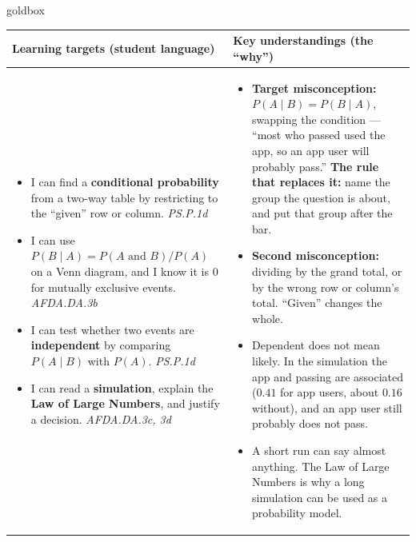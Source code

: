 \documentclass[10pt]{article}
\begin{document}
\renewcommand{\arraystretch}{1.4}
\boxguard
\begin{skillbox}{goldbox}
\begin{tabularx}{\linewidth}{@{}X|X@{}}
\textbf{Learning targets (student language)} & \textbf{Key understandings (the ``why'')} \\[2pt]
\hline
\vspace{-6pt}
\begin{itemize}[leftmargin=1.1em, nosep, after=\vspace{2pt}]
  \item I can find a \textbf{conditional probability} from a two-way table by restricting to the
        ``given'' row or column. \hfill \textit{PS.P.1d}
  \item I can use $P(B \mid A) = P(A \text{ and } B)/P(A)$ on a Venn diagram, and I know it is $0$
        for mutually exclusive events. \hfill \textit{AFDA.DA.3b}
  \item I can test whether two events are \textbf{independent} by comparing $P(A \mid B)$ with
        $P(A)$. \hfill \textit{PS.P.1d}
  \item I can read a \textbf{simulation}, explain the \textbf{Law of Large Numbers}, and justify a
        decision. \hfill \textit{AFDA.DA.3c, 3d}
\end{itemize}
&
\vspace{-6pt}
\begin{itemize}[leftmargin=1.1em, nosep, after=\vspace{2pt}]
  \item \textbf{Target misconception:} $P(A \mid B) = P(B \mid A)$, swapping the condition ---
        ``most who passed used the app, so an app user will probably pass.'' \textbf{The rule that
        replaces it:} name the group the question is about, and put that group after the bar.
  \item \textbf{Second misconception:} dividing by the grand total, or by the wrong row or
        column's total. ``Given'' changes the whole.
  \item Dependent does not mean likely. In the simulation the app and passing are associated
        ($0.41$ for app users, about $0.16$ without), and an app user still probably does not pass.
  \item A short run can say almost anything. The Law of Large Numbers is why a long simulation
        can be used as a probability model.
\end{itemize}
\end{tabularx}
\end{skillbox}
\end{document}
